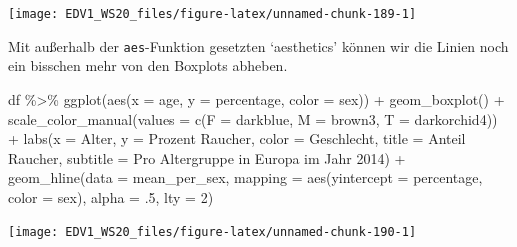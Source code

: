 \documentclass[
]{book}
\newenvironment{Shaded}{\begin{snugshade}}{\end{snugshade}}
\newcommand{\AttributeTok}[1]{\textcolor[rgb]{0.77,0.63,0.00}{#1}}
\newcommand{\DecValTok}[1]{\textcolor[rgb]{0.00,0.00,0.81}{#1}}
\newcommand{\FunctionTok}[1]{\textcolor[rgb]{0.00,0.00,0.00}{#1}}
\newcommand{\NormalTok}[1]{#1}
\newcommand{\SpecialCharTok}[1]{\textcolor[rgb]{0.00,0.00,0.00}{#1}}
\newcommand{\StringTok}[1]{\textcolor[rgb]{0.31,0.60,0.02}{#1}}
\begin{document}
\begin{center}\texttt{[image: EDV1\_WS20\_files/figure-latex/unnamed-chunk-189-1]} \end{center}

Mit außerhalb der \texttt{aes}-Funktion gesetzten `aesthetics' können wir die Linien noch ein bisschen mehr von den Boxplots abheben.

\begin{Shaded}
\begin{Highlighting}[]
\NormalTok{df }\SpecialCharTok{\%\textgreater{}\%} 
  \FunctionTok{ggplot}\NormalTok{(}\FunctionTok{aes}\NormalTok{(}\AttributeTok{x =}\NormalTok{ age,}
             \AttributeTok{y =}\NormalTok{ percentage,}
             \AttributeTok{color =}\NormalTok{ sex)) }\SpecialCharTok{+}
  \FunctionTok{geom\_boxplot}\NormalTok{() }\SpecialCharTok{+}
  \FunctionTok{scale\_color\_manual}\NormalTok{(}\AttributeTok{values =} \FunctionTok{c}\NormalTok{(}\AttributeTok{F =} \StringTok{\textquotesingle{}darkblue\textquotesingle{}}\NormalTok{,}
                               \AttributeTok{M =} \StringTok{\textquotesingle{}brown3\textquotesingle{}}\NormalTok{,}
                               \AttributeTok{T =} \StringTok{\textquotesingle{}darkorchid4\textquotesingle{}}\NormalTok{)) }\SpecialCharTok{+}
  \FunctionTok{labs}\NormalTok{(}\AttributeTok{x =} \StringTok{\textquotesingle{}Alter\textquotesingle{}}\NormalTok{,}
       \AttributeTok{y =} \StringTok{\textquotesingle{}Prozent Raucher\textquotesingle{}}\NormalTok{,}
       \AttributeTok{color =} \StringTok{\textquotesingle{}Geschlecht\textquotesingle{}}\NormalTok{,}
       \AttributeTok{title =} \StringTok{\textquotesingle{}Anteil Raucher\textquotesingle{}}\NormalTok{,}
       \AttributeTok{subtitle =} \StringTok{\textquotesingle{}Pro Altergruppe in Europa im Jahr 2014\textquotesingle{}}\NormalTok{) }\SpecialCharTok{+}
  \FunctionTok{geom\_hline}\NormalTok{(}\AttributeTok{data =}\NormalTok{ mean\_per\_sex,}
             \AttributeTok{mapping =} \FunctionTok{aes}\NormalTok{(}\AttributeTok{yintercept =}\NormalTok{ percentage,}
                           \AttributeTok{color =}\NormalTok{ sex),}
             \AttributeTok{alpha =}\NormalTok{ .}\DecValTok{5}\NormalTok{,}
             \AttributeTok{lty =} \DecValTok{2}\NormalTok{)}
\end{Highlighting}
\end{Shaded}

\begin{center}\texttt{[image: EDV1\_WS20\_files/figure-latex/unnamed-chunk-190-1]} \end{center}
\end{document}
